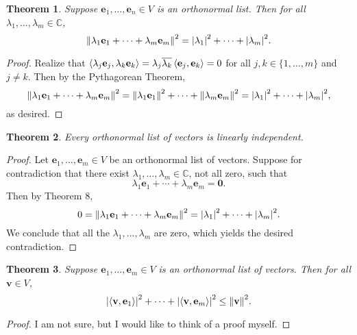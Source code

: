 \documentclass[11pt]{article}
\renewcommand{\vec}[1]{\mathbf{#1}}
\newcommand{\conjugate}[1]{\overline{#1}}
\newtheorem{theorem}{Theorem}
\begin{document}
\begin{adjustwidth}{0.5cm}{}
  \begin{theorem}
	  Suppose $\vec{e}_{1}, \ldots, \vec{e}_{n} \in V$ is an orthonormal list. Then for all $\lambda_{1}, \ldots, \lambda_{m} \in \mathbb{C}$,
	  \[
		  \norm{\lambda_{1} \vec{e}_{1} + \cdots + \lambda_{m} \vec{e}_{m}}^{2} = \abs{\lambda_{1}}^{2} + \cdots + \abs{\lambda_{m}}^{2}.
	  \]
  \end{theorem}
	\begin{proof}
		Realize that $\ev{\lambda_{j} \vec{e}_{j}, \lambda_{k} \vec{e}_{k}} = \lambda_{j} \conjugate{\lambda_{k}} \ev{\vec{e}_{j}, \vec{e}_{k}} = 0$ for all $j, k \in \{ 1, \ldots, m \}$ and $j \ne k$. Then by the Pythagorean Theorem,
		\[
			\norm{\lambda_{1} \vec{e}_{1} + \cdots + \lambda_{m} \vec{e}_{m}}^{2} = \norm{\lambda_{1} \vec{e}_{1}}^{2} + \cdots + \norm{\lambda_{m} \vec{e}_{m}}^{2} = \abs{\lambda_{1}}^{2} + \cdots + \abs{\lambda_{m}}^{2},
		\]
		as desired.
	\end{proof}
\end{adjustwidth}

\begin{adjustwidth}{0.5cm}{}
  \begin{theorem}
	  Every orthonormal list of vectors is linearly independent.
  \end{theorem}
	\begin{proof}
		Let $\vec{e}_{1}, \ldots, \vec{e}_{m} \in V$ be an orthonormal list of vectors. Suppose for contradiction that there exist $\lambda_{1}, \ldots, \lambda_{m} \in \mathbb{C}$, not all zero, such that
		\[
			\lambda_{1} \vec{e}_{1} + \cdots + \lambda_{m} \vec{e}_{m} = \vec{0}.
		\]
		Then by Theorem 8, 
		\[
			0 = \norm{\lambda_{1} \vec{e}_{1} + \cdots + \lambda_{m} \vec{e}_{m}}^{2} = \abs{\lambda_{1}}^{2} + \cdots + \abs{\lambda_{m}}^{2}.
		\]
		We conclude that all the $\lambda_{1}, \ldots, \lambda_{m}$ are zero, which yields the desired contradiction.
	\end{proof}
\end{adjustwidth}

\begin{adjustwidth}{0.5cm}{}
  \begin{theorem}
	  Suppose $\vec{e}_{1}, \ldots, \vec{e}_{m} \in V$ is an orthonormal list of vectors. Then for all $\vec{v} \in V$,
	  \[
		  \abs{\ev{\vec{v}, \vec{e}_{1}}}^{2} + \cdots + \abs{\ev{\vec{v}, \vec{e}_{m}}}^{2} \le \norm{\vec{v}}^{2}.
	  \]
  \end{theorem}
	\begin{proof}
		I am not sure, but I would like to think of a proof myself.
	\end{proof}
\end{adjustwidth}
\end{document}
